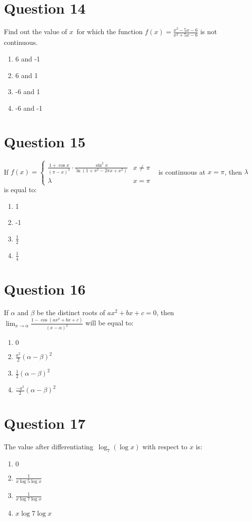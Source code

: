 \documentclass{article}
\begin{document}
\section*{Question 14}
Find out the value of \(x\) for which the function \(f(x)=\frac{x^2-5 x-6}{x^2+5 x-6}\) is not continuous.
\begin{enumerate}[label=(\alph*)]
\item 6 and -1
\item 6 and 1
\item -6 and 1
\item -6 and -1
\end{enumerate}
\newpage
\section*{Question 15}
If \(f(x)= \begin{cases}\frac{1+\cos x}{(\pi-x)^2} \cdot \frac{\sin ^2 x}{\ln \left(1+\pi^2-2 \pi x+x^2\right)} & x \neq \pi \\ \lambda & x=\pi\end{cases}\)  is continuous at \(x=\pi\), then \(\lambda\) is equal to:
\begin{enumerate}[label=(\alph*)]
\item 1
\item -1
\item \(\frac{1}{2}\)
\item \(\frac{1}{4}\)
\end{enumerate}
\newpage
\section*{Question 16}
If \(\alpha\) and \(\beta\) be the distinct roots of \(a x^2+b x+c=0\), then \(\lim _{x \rightarrow \alpha} \frac{1-\cos \left(a x^2+b x+c\right)}{(x-\alpha)^2}\) will be equal to:
\begin{enumerate}[label=(\alph*)]
\item \(0\)
\item \(\frac{a^2}{2}(\alpha-\beta)^2\)
\item \(\frac{1}{2}(\alpha-\beta)^2\)
\item \(\frac{-a^2}{2}(\alpha-\beta)^2\)
\end{enumerate}
\newpage
\section*{Question 17}
The value after differentiating \(\log _7(\log x)\) with respect to \(x\) is:
\begin{enumerate}[label=(\alph*)]
\item \(0\)
\item \(\frac{1}{x \log 5 \log x}\)
\item \(\frac{1}{x \log 7 \log x}\)
\item \(x \log 7 \log x\)
\end{enumerate}
\newpage
\end{document}
